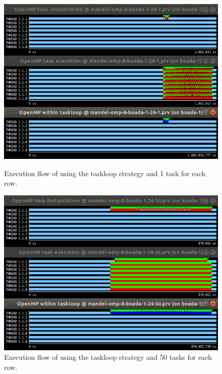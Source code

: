 \documentclass[12pt, a4paper]{article}
\begin{document}
\begin{figure}[H]
\begin{minipage}[t]{0.48\linewidth}
  \centering
  \includegraphics[scale=0.35]{./S2_OMP_tasks_24_1}
  \caption{Execution flow of using the taskloop strategy and 1 task for each row.}
  \label{fig:S2_OMP_tasks_24_1}
\end{minipage}%
\hspace{0.5cm}
\begin{minipage}[t]{0.48\linewidth}
  \centering
  \includegraphics[scale=0.35]{./S2_OMP_tasks_24_50}
  \caption{Execution flow of using the taskloop strategy and 50 tasks for each row.}
  \label{fig:S2_OMP_tasks_24_50}
\end{minipage}
\end{figure}
\end{document}
